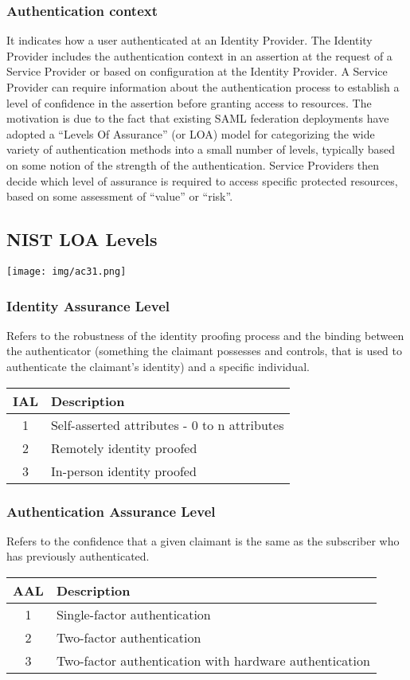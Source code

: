 \documentclass[a4paper, 10pt, titlepage]{article}
\begin{document}
\subsubsection*{Authentication context}
It indicates how a user authenticated at an Identity Provider. The Identity Provider includes the authentication context in an assertion at the request of a Service Provider or based on configuration at the Identity Provider. A Service Provider can require information about the authentication process to establish a level of confidence in the assertion before granting access to resources.
The motivation is due to the fact that existing SAML federation deployments have adopted a “Levels Of Assurance” (or LOA) model for categorizing the wide variety of authentication methods into a small number of levels, typically based on some notion of the strength of the authentication. Service Providers then decide which level of assurance is required to access specific protected resources, based on some assessment of “value” or “risk”.

\subsection*{NIST LOA Levels}
\begin{center}
\texttt{[image: img/ac31.png]}
\end{center}

\subsubsection*{Identity Assurance Level}
Refers to the robustness of the identity proofing process and the binding between the authenticator (something the claimant possesses and controls, that is used to authenticate the claimant’s identity) and a specific individual.
\begin{center}
\begin{tabular}{|c|l|} \hline
IAL & Description \\ \hline
1 & Self-asserted attributes - 0 to n attributes \\
2 & Remotely identity proofed\\
3 & In-person identity proofed\\ \hline
\end{tabular}
\end{center}
\subsubsection*{Authentication Assurance Level}
Refers to the confidence that a given claimant is the same as the subscriber who has previously authenticated.
\begin{center}
\begin{tabular}{|c|l|} \hline
AAL & Description \\ \hline
1 & Single-factor authentication\\
2 & Two-factor authentication\\
3 & Two-factor authentication with hardware authentication\\ \hline
\end{tabular}
\end{center}
\end{document}
